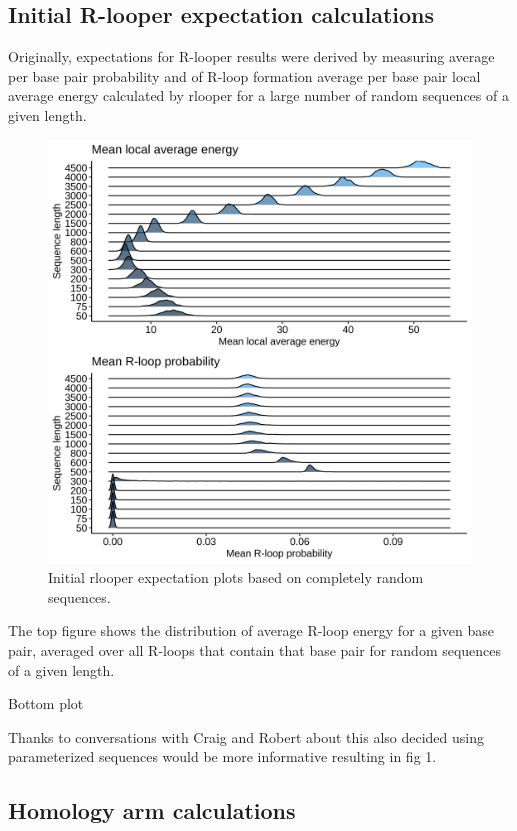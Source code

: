 \documentclass[11pt]{article}
\begin{document}
\subsection{Initial R-looper expectation calculations}

Originally, expectations for R-looper results were derived by measuring average per base pair probability and of R-loop formation average per base pair local average energy calculated by rlooper for a large number of random sequences of a given length. 

\begin{figure}[H]
	\includegraphics[width=15cm]{images/plots/rand_seq_LAE_dist.png}
	\centering
	\caption{Initial rlooper expectation plots based on completely random sequences.}
\end{figure}

The top figure shows the distribution of average R-loop energy for a given base pair, averaged over all R-loops that contain that base pair for random sequences of a given length.

Bottom plot

Thanks to conversations with Craig and Robert about this also decided using parameterized sequences would be more informative resulting in fig 1.


\subsection{Homology arm calculations}
\end{document}

